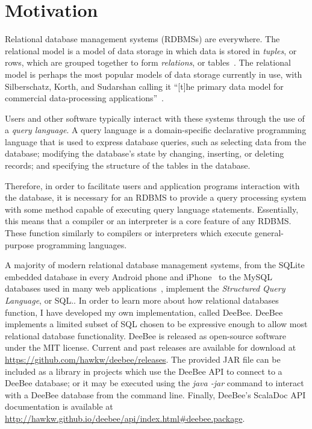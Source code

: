 

\usepackage{minted}
\usepackage{hyperref}
\usepackage{cleveref}
\usepackage{lmodern}
\usepackage{placeins}
\usepackage{syntax}


\MYHEADERS{}
\PLEDGE{}
\tableofcontents
\vfill
\pagebreak
\section{Motivation}

Relational database management systems (RDBMSs) are everywhere. The relational model is a model of data storage in which data is stored in \textit{tuples}, or rows, which are grouped together to form \textit{relations}, or tables~\cite{silberschatz2010database,harrington2009relational,garcia2000database}. The relational model is perhaps the most popular models of data storage currently in use, with Silberschatz, Korth, and Sudarshan calling it ``[t]he primary data model for commercial data-processing applications''~\cite[page 39]{silberschatz2010database}.

Users and other software typically interact with these systems through the use of a \textit{query language}. A query language is a domain-specific declarative programming language that is used to express database queries, such as selecting data from the database; modifying the database's state by changing, inserting, or deleting records; and specifying the structure of the tables in the database. 

Therefore, in order to facilitate users and application programs interaction with the database, it is necessary for an RDBMS to provide a query processing system with some method capable of executing query language statements. Essentially, this means that a compiler or an interpreter is a core feature of any RDBMS. These function similarly to compilers or interpreters which execute general-purpose programming languages.

A majority of modern relational database management systems, from the SQLite embedded database in every Android phone and iPhone~\cite{sqliteFamous} to the MySQL databases used in many web applications~\cite{onLamp}, implement the \textit{Structured Query Language}, or SQL.\cite{silberschatz2010database}. In order to learn more about how relational databases function, I have developed my own implementation, called DeeBee. DeeBee implements a limited subset of SQL chosen to be expressive enough to allow most relational database functionality. 
DeeBee is released as open-source software under the MIT license. Current and past releases are available for download at \url{https://github.com/hawkw/deebee/releases}. The provided JAR file can be included as a library in projects which use the DeeBee API to connect to a DeeBee database; or it may be executed using the \textit{java -jar} command to interact with a DeeBee database from the command line. Finally, DeeBee's ScalaDoc API documentation is available at \url{http://hawkw.github.io/deebee/api/index.html#deebee.package}.


